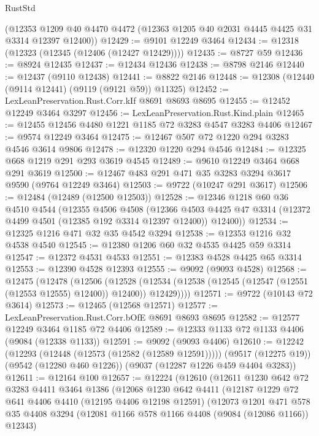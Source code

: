 \begin{lexlean}{RustStd}
\begin{coremodule}
    (@12353 @1209 @40 @4470 @4472 (@12363 @1205 @40 @2031 @4445 @4425 @31 @3314 @12397 @12400))
@12429 := @9101 @12249 @3464
@12434 := @12318 (@12323 (@12345 (@12406 (@12427 @12429))))
@12435 := @8727 @59
@12436 := @8924 @12435
@12437 := @12434 @12436
@12438 := @8798 @2146
@12440 := @12437 (@9110 @12438)
@12441 := @8822 @2146
@12448 := @12308 (@12440 (@9114 @12441) (@9119 (@9121 @59)) @11325)
@12452 := LexLeanPreservation.Rust.Corr.kIf @8691 @8693 @8695
@12455 := @12452 @12249 @3464 @3297
@12456 := LexLeanPreservation.Rust.Kind.plain
@12465 := @12455 @12456 @4480 @1221 @1185 @72 @3283 @4547 @3283 @4406
@12467 := @9574 @12249 @3464
@12475 := @12467 @507 @72 @1220 @294 @3283 @4546 @3614 @9806
@12478 := @12320 @1220 @294 @4546
@12484 := @12325 @668 @1219 @291 @293 @3619 @4545
@12489 := @9610 @12249 @3464 @668 @291 @3619
@12500 := @12467 @483 @291 @471 @35 @3283 @3294 @3617 @9590 (@9764 @12249 @3464)
@12503 := @9722 (@10247 @291 @3617)
@12506 := @12484 (@12489 (@12500 @12503))
@12528 := @12346
    @1218
    @60
    @36
    @4510
    @4544
    (@12355
      @4506
      @4508
      (@12366 @4503 @4425 @47 @3314 (@12372 @4499 @4501 (@12385 @192 @3314 @12397 @12400)) @12400))
@12534 := @12325 @1216 @471 @32 @35 @4542 @3294
@12538 := @12353 @1216 @32 @4538 @4540
@12545 := @12380 @1206 @60 @32 @4535 @4425 @59 @3314
@12547 := @12372 @4531 @4533
@12551 := @12383 @4528 @4425 @65 @3314
@12553 := @12390 @4528 @12393
@12555 := @9092 (@9093 @4528)
@12568 := @12475
    (@12478
      (@12506
        (@12528 (@12534 (@12538 (@12545 (@12547 (@12551 (@12553 @12555) @12400)) @12400)) @12429))))
@12571 := @9722 (@10143 @72 @3614)
@12573 := @12465 (@12568 @12571)
@12577 := LexLeanPreservation.Rust.Corr.bOfE @8691 @8693 @8695
@12582 := @12577 @12249 @3464 @1185 @72 @4406
@12589 := @12333 @1133 @72 @1133 @4406 (@9084 (@12338 @1133))
@12591 := @9092 (@9093 @4406)
@12610 := @12242
    (@12293 (@12448 (@12573 (@12582 (@12589 @12591)))))
    (@9517 (@12275 @19))
    (@9542 (@12280 @460 @1226))
    (@9037 (@12287 @1226 @459 @4404 @3283))
@12611 := @12164 @100
@12657 := @12224
    (@12610
      (@12611
        @1230
        @642
        @72
        @3283
        @4411
        @3464
        @1386
        (@12068
          @1230
          @642
          @4411
          (@12187
            @1229
            @72
            @641
            @4406
            @4410
            (@12195 @4406 @12198 @12591)
            (@12073
              @1201
              @471
              @578
              @35
              @4408
              @3294
              (@12081 @1166 @578 @1166 @4408 (@9084 (@12086 @1166)) @12343)

\end{coremodule}
\end{lexlean}

